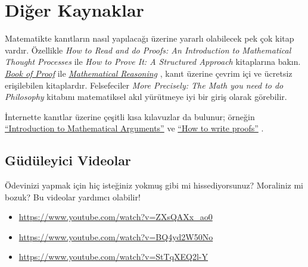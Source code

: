 \documentclass[../../../include/open-logic-section]{subfiles}
\begin{document}

\section{Diğer Kaynaklar}

Matematikte kanıtların nasıl yapılacağı üzerine yararlı olabilecek pek
çok kitap vardır. Özellikle \emph{How to Read and do Proofs: An
Introduction to Mathematical Thought Processes} \citep{Solow2013} ile
\emph{How to Prove It: A Structured Approach} \citep{Velleman2019}
kitaplarına bakın. \href{http://www.people.vcu.edu/~rhammack/BookOfProof/BookOfProof.pdf}{\emph{Book
of Proof}} \citep{Hammack2013} ile
\href{https://scholarworks.gvsu.edu/books/7/}{\emph{Mathematical
Reasoning}} \citep{Sandstrum2019}, kanıt üzerine çevrim içi ve ücretsiz
erişilebilen kitaplardır. Felsefeciler
\emph{More Precisely: The Math you need to do Philosophy}
\citep{Steinhart2018} kitabını matematiksel akıl yürütmeye iyi bir giriş
olarak görebilir.

İnternette kanıtlar üzerine çeşitli kısa kılavuzlar da bulunur; örneğin
\href{https://math.berkeley.edu/~hutching/teach/proofs.pdf}{``Introduction
  to Mathematical Arguments''} \citep{Hutchings2003} ve
\href{https://eugeniacheng.com/wp-content/uploads/2017/02/cheng-proofguide.pdf}{``How to
  write proofs''} \citep{Cheng2004}.

\subsection{Güdüleyici Videolar}

Ödevinizi yapmak için hiç isteğiniz yokmuş gibi mi hissediyorsunuz?
Moraliniz mi bozuk? Bu videolar yardımcı olabilir!

\begin{itemize}
\item \url{https://www.youtube.com/watch?v=ZXsQAXx_ao0}
\item \url{https://www.youtube.com/watch?v=BQ4yd2W50No}
\item \url{https://www.youtube.com/watch?v=StTqXEQ2l-Y}
\end{itemize}
\end{document}
